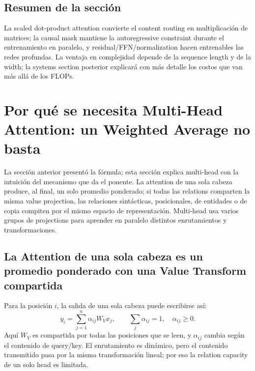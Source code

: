 \documentclass[a4paper]{article}
\begin{document}

\subsection{Resumen de la sección}

La scaled dot-product attention convierte el content routing en multiplicación de matrices; la causal mask mantiene la autoregressive constraint durante el entrenamiento en paralelo, y residual/FFN/normalization hacen entrenables las redes profundas. La ventaja en complejidad depende de la sequence length y de la width; la systems section posterior explicará con más detalle los costos que van más allá de los FLOPs.
\section{Por qué se necesita Multi-Head Attention: un Weighted Average no basta}

La sección anterior presentó la fórmula; esta sección explica multi-head con la intuición del mecanismo que da el ponente. La attention de una sola cabeza produce, al final, un solo promedio ponderado; si todas las relations comparten la misma value projection, las relaciones sintácticas, posicionales, de entidades o de copia compiten por el mismo espacio de representación. Multi-head usa varios grupos de projections para aprender en paralelo distintos enrutamientos y transformaciones.

\subsection{La Attention de una sola cabeza es un promedio ponderado con una Value Transform compartida}

Para la posición $i$, la salida de una sola cabeza puede escribirse así:
\[
y_i=\sum_{j=1}^{n}\alpha_{ij}W_Vx_j,
\qquad \sum_j\alpha_{ij}=1,\quad \alpha_{ij}\ge 0.
\]
Aquí $W_V$ es compartida por todas las posiciones que se leen, y $\alpha_{ij}$ cambia según el contenido de query/key. El enrutamiento es dinámico, pero el contenido transmitido pasa por la misma transformación lineal; por eso la relation capacity de un solo head es limitada.
\end{document}
